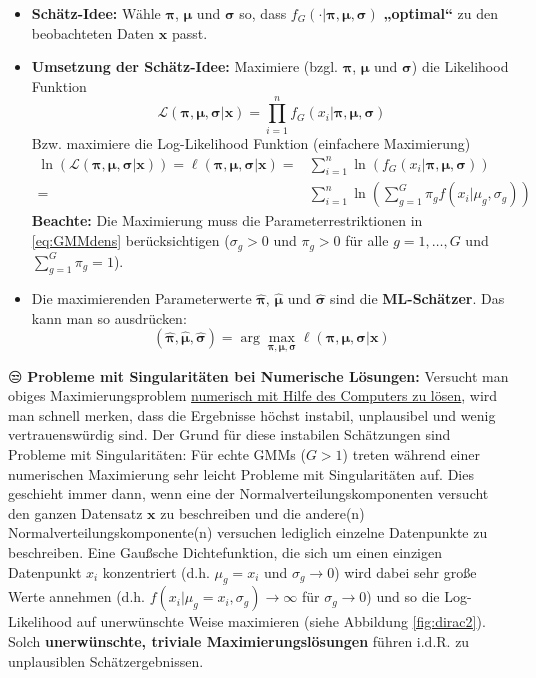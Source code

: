 \documentclass[
  ngerman,
]{book}
\begin{document}
\begin{itemize}
\item
  \textbf{Schätz-Idee:} Wähle \(\boldsymbol{\pi}\), \(\boldsymbol{\mu}\) und \(\boldsymbol{\sigma}\) so, dass \(f_G(\cdot|\boldsymbol{\pi},\boldsymbol{\mu},\boldsymbol{\sigma})\) \textbf{„optimal``} zu den beobachteten Daten \(\mathbf{x}\) passt.
\item
  \textbf{Umsetzung der Schätz-Idee:} Maximiere (bzgl. \(\boldsymbol{\pi}\), \(\boldsymbol{\mu}\) und \(\boldsymbol{\sigma}\)) die Likelihood Funktion
  \[\mathcal{L}(\boldsymbol{\pi},\boldsymbol{\mu},\boldsymbol{\sigma}|\mathbf{x})=\prod_{i=1}^nf_G(x_i|\boldsymbol{\pi},\boldsymbol{\mu},\boldsymbol{\sigma})\]
  Bzw. maximiere die Log-Likelihood Funktion (einfachere Maximierung)
  \begin{align*}
  \ln\left(\mathcal{L}(\boldsymbol{\pi},\boldsymbol{\mu},\boldsymbol{\sigma}|\mathbf{x})\right)=
  \ell(\boldsymbol{\pi},\boldsymbol{\mu},\boldsymbol{\sigma}|\mathbf{x})
  =&\sum_{i=1}^n\ln\left(f_G(x_i|\boldsymbol{\pi},\boldsymbol{\mu},\boldsymbol{\sigma})\right)\\
  =&\sum_{i=1}^n\ln\left(\sum_{g=1}^G\pi_gf(x_i|\mu_g,\sigma_g)\right)
  \end{align*}
  \textbf{Beachte:} Die Maximierung muss die Parameterrestriktionen in \eqref{eq:GMMdens} berücksichtigen (\(\sigma_g>0\) und \(\pi_g>0\) für alle \(g=1,\dots,G\) und \(\sum_{g=1}^G\pi_g=1\)).
\item
  Die maximierenden Parameterwerte {\(\hat{\boldsymbol{\pi}}\)}, {\(\hat{\boldsymbol{\mu}}\)} und {\(\hat{\boldsymbol{\sigma}}\)} sind die {\textbf{ML-Schätzer}}. Das kann man so ausdrücken:
  \[
  (\hat{\boldsymbol{\pi}},\hat{\boldsymbol{\mu}},\hat{\boldsymbol{\sigma}})=\arg\max_{\boldsymbol{\pi},\boldsymbol{\mu},\boldsymbol{\sigma}}\ell(\boldsymbol{\pi},\boldsymbol{\mu},\boldsymbol{\sigma}|\mathbf{x})
  \]
\end{itemize}

😒 \textbf{Probleme mit Singularitäten bei Numerische Lösungen:} Versucht man obiges Maximierungsproblem \href{https://cran.r-project.org/web/packages/EstimationTools/vignettes/maxlogL.pdf}{numerisch mit Hilfe des Computers zu lösen}, wird man schnell merken, dass die Ergebnisse höchst instabil, unplausibel und wenig vertrauenswürdig sind. Der Grund für diese instabilen Schätzungen sind Probleme mit Singularitäten:
Für echte GMMs (\(G>1\)) treten während einer numerischen Maximierung sehr leicht Probleme mit Singularitäten auf. Dies geschieht immer dann, wenn eine der Normalverteilungskomponenten versucht den ganzen Datensatz \(\mathbf{x}\) zu beschreiben und die andere(n) Normalverteilungskomponente(n) versuchen lediglich einzelne Datenpunkte zu beschreiben. Eine Gaußsche Dichtefunktion, die sich um einen einzigen Datenpunkt \(x_i\) konzentriert (d.h. \(\mu_g=x_i\) und \(\sigma_g\to 0\)) wird dabei sehr große Werte annehmen (d.h. \(f(x_i|\mu_g=x_i,\sigma_g)\to\infty\) für \(\sigma_g\to 0\)) und so die Log-Likelihood auf unerwünschte Weise maximieren (siehe Abbildung \ref{fig:dirac2}). Solch \textbf{unerwünschte, triviale Maximierungslösungen} führen i.d.R. zu unplausiblen Schätzergebnissen.
\end{document}
